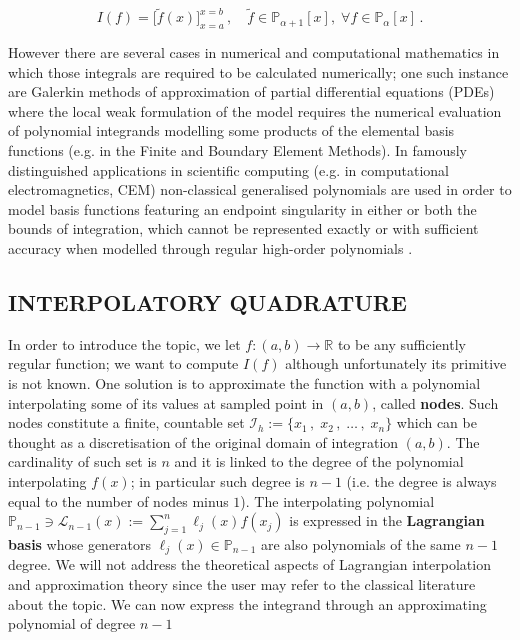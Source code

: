 \documentclass[a4paper, twosided]{book}
\begin{document}
\begin{equation}\label{eq1.2}
    I(f) = \Big[\tilde{f}(x)\Big]_{x=a}^{x=b}\,,\quad\tilde{f}\in\mathbb{P}_{\alpha+1}[x], \;\forall f\in\mathbb{P}_{\alpha}[x]\,.
\end{equation}

\noindent
However there are several cases in numerical and computational mathematics in which those integrals are required to be calculated numerically; one such instance are Galerkin methods of approximation of partial differential equations (PDEs) where the local weak formulation of the model requires the numerical evaluation of polynomial integrands modelling some products of the elemental basis functions (e.g. in the Finite and Boundary Element Methods). In famously distinguished applications in scientific computing (e.g. in computational electromagnetics, CEM) non-classical generalised polynomials are used in order to model basis functions featuring an endpoint singularity in either or both the bounds of integration, which cannot be represented exactly or with sufficient accuracy when modelled through regular high-order polynomials  \cite{Graglia04,Graglia08}.

\subsection[Interpolatory quadrature]{\changefont INTERPOLATORY QUADRATURE}\label{SubSec1.2.1}

In order to introduce the topic, we let $f:(a,b)\to\mathbb{R}$ to be any sufficiently regular function; we want to compute $I(f)$ although unfortunately its primitive is not known. One solution is to approximate the function with a polynomial interpolating some of its values at sampled point in $(a,b)$, called \color{poliDarkBlue} \textbf{nodes}\color{black}. Such nodes constitute a finite, countable set $\mathcal{I}_h:=\{x_1\,,\;x_2\,,\;\dots\,,\;x_{n}\}$ which can be thought as a discretisation of the original domain of integration $(a,b)$. The cardinality of such set is  $n$ and it is linked to the degree of the polynomial interpolating $f(x)$; in particular such degree is $n-1$ (i.e. the degree is always equal to the number of nodes minus $1$). The interpolating polynomial $\mathbb{P}_{n-1}\ni\mathcal{L}_{n-1}(x):=\sum_{j=1}^{n}\ell_j(x)f(x_j)$ is expressed in the \color{poliDarkBlue} \textbf{Lagrangian basis} \color{black} whose generators $\ell_j(x)\in\mathbb{P}_{n-1}$ are also polynomials of the same $n-1$ degree. We will not address the theoretical aspects of Lagrangian interpolation and approximation theory since the user may refer to the classical literature about the topic. We can now express the integrand through an approximating polynomial of degree $n-1$
\end{document}
